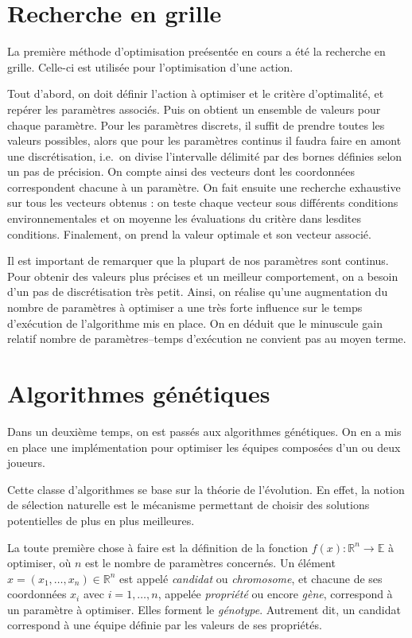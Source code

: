 \documentclass[12pt,a4paper]{article}
\begin{document}
\section{Recherche en grille}
La premi\`ere m\'ethode d'optimisation pre\'esent\'ee en cours a \'et\'e la 
recherche en grille. Celle-ci est utilis\'ee pour l'optimisation d'une 
action.

Tout d'abord, on doit d\'efinir l'action \`a optimiser et le crit\`ere 
d'optimalit\'e, et rep\'erer les param\`etres associ\'es. Puis on 
obtient un ensemble de valeurs pour chaque param\`etre. 
Pour les param\`etres discrets, il suffit de prendre toutes les valeurs 
possibles, alors que pour les param\`etres continus il faudra faire en amont 
une discr\'etisation, i.e.\ on divise l'intervalle d\'elimit\'e par des bornes 
d\'efinies selon un pas de pr\'ecision. On compte ainsi des vecteurs dont les 
coordonn\'ees correspondent chacune \`a un param\`etre. On fait ensuite une 
recherche exhaustive sur tous les vecteurs obtenus : on teste chaque vecteur 
sous diff\'erents conditions environnementales et on moyenne les \'evaluations 
 du crit\`ere dans lesdites conditions. Finalement, on prend la valeur optimale 
et son vecteur associ\'e.

Il est important de remarquer que la plupart de nos param\`etres sont continus. 
Pour obtenir des valeurs plus pr\'ecises et un meilleur comportement, on a 
besoin d'un pas de discr\'etisation tr\`es petit. Ainsi, on r\'ealise qu'une 
augmentation du nombre de param\`etres \`a optimiser a une tr\`es forte 
influence sur le temps d'ex\'ecution de l'algorithme mis en place. On en 
d\'eduit que le minuscule gain relatif nombre de param\`etres--temps 
d'ex\'ecution ne convient pas au moyen terme.

\section{Algorithmes g\'en\'etiques}
Dans un deuxi\`eme temps, on est pass\'es aux algorithmes g\'en\'etiques. On en 
a mis en place une impl\'ementation pour optimiser les \'equipes compos\'ees 
d'un ou deux joueurs.

Cette classe d'algorithmes se base sur la th\'eorie de l'\'evolution. En effet, 
la notion de s\'election naturelle est le m\'ecanisme permettant de choisir des 
solutions potentielles de plus en plus meilleures.

La toute premi\`ere chose \`a faire est la d\'efinition de la fonction 
$f(x): \mathbb{R}^n \to \mathbb{E}$ \`a optimiser, o\`u $n$ est le nombre de 
param\`etres concern\'es. Un \'el\'ement $x=(x_1,\dotsc,x_n) \in \mathbb{R}^n$ 
est appel\'e {\itshape candidat} ou {\itshape chromosome}, et chacune de ses 
coordonn\'ees $x_i$ avec $i=1,\dotsc,n$, appel\'ee {\itshape propri\'et\'e} 
ou encore {\itshape g\`ene}, correspond \`a un param\`etre \`a optimiser. Elles 
forment le {\itshape g\'enotype}.
Autrement dit, un candidat correspond \`a une \'equipe d\'efinie par les valeurs
de ses propri\'et\'es.
\end{document}
